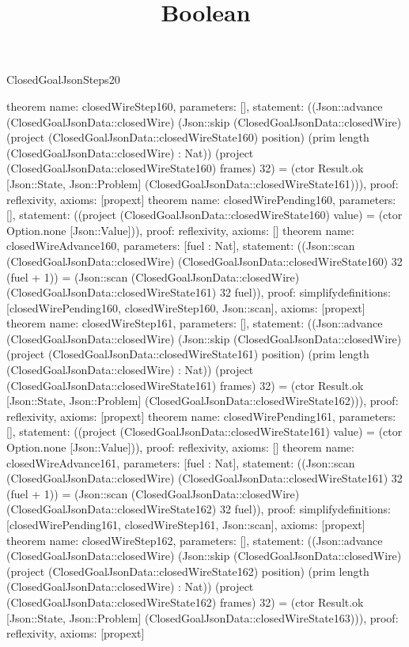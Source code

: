\begin{lexlean}{ClosedGoalJsonSteps20}
\title{Boolean}
\begin{semanticmodule}
theorem{
 name: closedWireStep160, parameters: [],
 statement: ((Json::advance (ClosedGoalJsonData::closedWire) (Json::skip (ClosedGoalJsonData::closedWire) (project (ClosedGoalJsonData::closedWireState160) position) (prim length (ClosedGoalJsonData::closedWire) : Nat)) (project (ClosedGoalJsonData::closedWireState160) frames) 32) = (ctor Result.ok [Json::State, Json::Problem] (ClosedGoalJsonData::closedWireState161))), proof: reflexivity{}, axioms: [propext]
}
theorem{
 name: closedWirePending160, parameters: [],
 statement: ((project (ClosedGoalJsonData::closedWireState160) value) = (ctor Option.none [Json::Value])), proof: reflexivity{}, axioms: []
}
theorem{
 name: closedWireAdvance160, parameters: [fuel : Nat],
 statement: ((Json::scan (ClosedGoalJsonData::closedWire) (ClosedGoalJsonData::closedWireState160) 32 (fuel + 1)) = (Json::scan (ClosedGoalJsonData::closedWire) (ClosedGoalJsonData::closedWireState161) 32 fuel)), proof: simplify{definitions: [closedWirePending160, closedWireStep160, Json::scan]}, axioms: [propext]
}
theorem{
 name: closedWireStep161, parameters: [],
 statement: ((Json::advance (ClosedGoalJsonData::closedWire) (Json::skip (ClosedGoalJsonData::closedWire) (project (ClosedGoalJsonData::closedWireState161) position) (prim length (ClosedGoalJsonData::closedWire) : Nat)) (project (ClosedGoalJsonData::closedWireState161) frames) 32) = (ctor Result.ok [Json::State, Json::Problem] (ClosedGoalJsonData::closedWireState162))), proof: reflexivity{}, axioms: [propext]
}
theorem{
 name: closedWirePending161, parameters: [],
 statement: ((project (ClosedGoalJsonData::closedWireState161) value) = (ctor Option.none [Json::Value])), proof: reflexivity{}, axioms: []
}
theorem{
 name: closedWireAdvance161, parameters: [fuel : Nat],
 statement: ((Json::scan (ClosedGoalJsonData::closedWire) (ClosedGoalJsonData::closedWireState161) 32 (fuel + 1)) = (Json::scan (ClosedGoalJsonData::closedWire) (ClosedGoalJsonData::closedWireState162) 32 fuel)), proof: simplify{definitions: [closedWirePending161, closedWireStep161, Json::scan]}, axioms: [propext]
}
theorem{
 name: closedWireStep162, parameters: [],
 statement: ((Json::advance (ClosedGoalJsonData::closedWire) (Json::skip (ClosedGoalJsonData::closedWire) (project (ClosedGoalJsonData::closedWireState162) position) (prim length (ClosedGoalJsonData::closedWire) : Nat)) (project (ClosedGoalJsonData::closedWireState162) frames) 32) = (ctor Result.ok [Json::State, Json::Problem] (ClosedGoalJsonData::closedWireState163))), proof: reflexivity{}, axioms: [propext]
}
\end{semanticmodule}
\end{lexlean}
